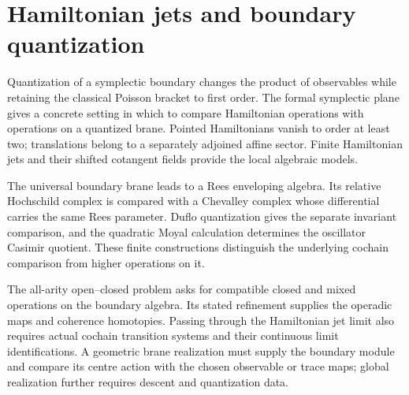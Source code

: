 \chapter*{Hamiltonian jets and boundary quantization}

Quantization of a symplectic boundary changes the product of observables while retaining the classical Poisson bracket to first order. The formal symplectic plane gives a concrete setting in which to compare Hamiltonian operations with operations on a quantized brane. Pointed Hamiltonians vanish to order at least two; translations belong to a separately adjoined affine sector. Finite Hamiltonian jets and their shifted cotangent fields provide the local algebraic models.

The universal boundary brane leads to a Rees enveloping algebra. Its relative Hochschild complex is compared with a Chevalley complex whose differential carries the same Rees parameter. Duflo quantization gives the separate invariant comparison, and the quadratic Moyal calculation determines the oscillator Casimir quotient. These finite constructions distinguish the underlying cochain comparison from higher operations on it.

The all-arity open--closed problem asks for compatible closed and mixed operations on the boundary algebra. Its stated refinement supplies the operadic maps and coherence homotopies. Passing through the Hamiltonian jet limit also requires actual cochain transition systems and their continuous limit identifications. A geometric brane realization must supply the boundary module and compare its centre action with the chosen observable or trace maps; global realization further requires descent and quantization data.
